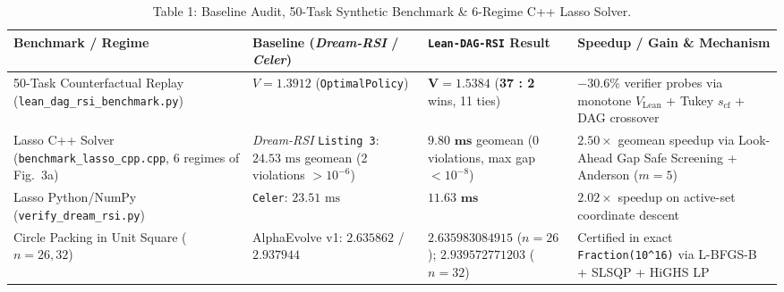 \documentclass[11pt,a4paper]{article}
\begin{document}
\begin{table}[ht!]
\centering
\caption{Table 1: Baseline Audit, 50-Task Synthetic Benchmark \& 6-Regime C++ Lasso Solver.}
\label{tab:baseline_lasso}
\footnotesize
\begin{tabular}{p{3.8cm}p{3.6cm}p{3.6cm}p{4.4cm}}
\toprule
\textbf{Benchmark / Regime} & \textbf{Baseline (\emph{Dream-RSI} / \emph{Celer})} & \textbf{\texttt{Lean-DAG-RSI} Result} & \textbf{Speedup / Gain \& Mechanism} \\
\midrule
50-Task Counterfactual Replay (\texttt{lean\_dag\_rsi\_benchmark.py}) & $V = 1.3912$ (\texttt{OptimalPolicy}) & $\mathbf{V = 1.5384}$ (\textbf{37 : 2} wins, 11 ties) & $\mathbf{-30.6\%}$ verifier probes via monotone $V_{\text{Lean}}$ + Tukey $s_{\text{cf}}$ + DAG crossover \\
\addlinespace
Lasso C++ Solver (\texttt{benchmark\_lasso\_cpp.cpp}, 6 regimes of Fig.~3a) & \emph{Dream-RSI} \texttt{Listing 3}: $24.53\text{ ms}$ geomean (2 violations $>10^{-6}$) & $\mathbf{9.80\text{ ms}}$ geomean ($0$ violations, max gap $< 10^{-8}$) & $\mathbf{2.50\times}$ geomean speedup via Look-Ahead Gap Safe Screening + Anderson ($m=5$) \\
\addlinespace
Lasso Python/NumPy (\texttt{verify\_dream\_rsi.py}) & \texttt{Celer}: $23.51\text{ ms}$ & $\mathbf{11.63\text{ ms}}$ & $\mathbf{2.02\times}$ speedup on active-set coordinate descent \\
\addlinespace
Circle Packing in Unit Square ($n=26, 32$) & AlphaEvolve v1: $2.635862$ / $2.937944$ & $\mathbf{2.635983084915}$ ($n=26$); $\mathbf{2.939572771203}$ ($n=32$) & Certified in exact \texttt{Fraction(10\^{}16)} via L-BFGS-B + SLSQP + HiGHS LP \\
\bottomrule
\end{tabular}
\end{table}
\end{document}
